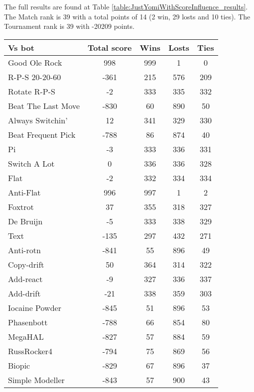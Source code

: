 The full results are found at Table \ref{table:JustYomiWithScoreInfluence_results}. The Match rank is 39 with a total points of 14 (2 win, 29 losts and 10 ties). The Tournament rank is 39 with -20209 points.

\begin{table*}
    \caption{JustYomiWithScoreInfluence results}
    \label{table:JustYomiWithScoreInfluence_results}
    \centering
    \begin{tabular}{|l|c|c|c|c|}
        \hline
        \textbf{Vs bot} & \textbf{Total score} & \textbf{Wins} & \textbf{Losts} & \textbf{Ties} \\ \hline
Good Ole Rock & 998 & 999 & 1 & 0 \\ \hline 
R-P-S 20-20-60 & -361 & 215 & 576 & 209 \\ \hline 
Rotate R-P-S & -2 & 333 & 335 & 332 \\ \hline 
Beat The Last Move & -830 & 60 & 890 & 50 \\ \hline 
Always Switchin' & 12 & 341 & 329 & 330 \\ \hline 
Beat Frequent Pick & -788 & 86 & 874 & 40 \\ \hline 
Pi & -3 & 333 & 336 & 331 \\ \hline 
Switch A Lot & 0 & 336 & 336 & 328 \\ \hline 
Flat & -2 & 332 & 334 & 334 \\ \hline 
Anti-Flat & 996 & 997 & 1 & 2 \\ \hline 
Foxtrot & 37 & 355 & 318 & 327 \\ \hline 
De Bruijn & -5 & 333 & 338 & 329 \\ \hline 
Text & -135 & 297 & 432 & 271 \\ \hline 
Anti-rotn & -841 & 55 & 896 & 49 \\ \hline 
Copy-drift & 50 & 364 & 314 & 322 \\ \hline 
Add-react & -9 & 327 & 336 & 337 \\ \hline 
Add-drift & -21 & 338 & 359 & 303 \\ \hline 
Iocaine Powder & -845 & 51 & 896 & 53 \\ \hline 
Phasenbott & -788 & 66 & 854 & 80 \\ \hline 
MegaHAL & -827 & 57 & 884 & 59 \\ \hline 
RussRocker4 & -794 & 75 & 869 & 56 \\ \hline 
Biopic & -829 & 67 & 896 & 37 \\ \hline 
Simple Modeller & -843 & 57 & 900 & 43 \\ \hline 

\end{tabular}
\end{table*}
